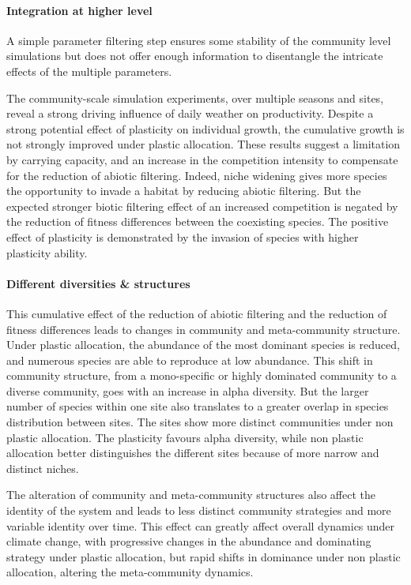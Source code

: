 \paragraph{Integration at higher level}

A simple parameter filtering step ensures some stability of the community level simulations but does not offer enough information to disentangle the intricate effects of the multiple parameters. 

The community-scale simulation experiments, over multiple seasons and sites, reveal a strong driving influence of daily weather on productivity. Despite a strong potential effect of plasticity on individual growth, the cumulative growth is not strongly improved under plastic allocation. These results suggest a limitation by carrying capacity, and an increase in the competition intensity to compensate for the reduction of abiotic filtering. Indeed, niche widening gives more species the opportunity to invade a habitat by reducing abiotic filtering. But the expected stronger biotic filtering effect of an increased competition is negated by the reduction of fitness differences between the coexisting species. The positive effect of plasticity is demonstrated by the invasion of species with higher plasticity ability.


\paragraph{Different diversities \& structures}
This cumulative effect of the reduction of abiotic filtering and the reduction of fitness differences leads to changes in community and meta-community structure. Under plastic allocation, the abundance of the most dominant species is reduced, and numerous species are able to reproduce at low abundance. This shift in community structure, from a mono-specific or highly dominated community to a diverse community, goes with an increase in alpha diversity. But the larger number of species within one site also translates to a greater overlap in species distribution between sites. The sites show more distinct communities under non plastic allocation. The plasticity favours alpha diversity, while non plastic allocation better distinguishes the different sites because of more narrow and distinct niches.

The alteration of community and meta-community structures also affect the identity of the system and leads to less distinct community strategies and more variable identity over time. This effect can greatly affect overall dynamics under climate change, with progressive changes in the abundance and dominating strategy under plastic allocation, but rapid shifts in dominance under non plastic allocation, altering the meta-community dynamics.


